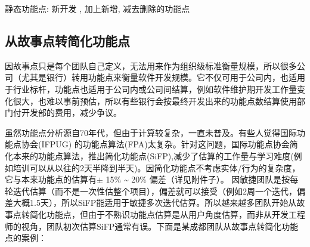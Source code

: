静态功能点: 新开发 , 加上新增, 减去删除的功能点

\begin{description}
\item[]
\end{description}

\hypertarget{ux4eceux6545ux4e8bux70b9ux8f6cux7b80ux5316ux529fux80fdux70b9}{%
\subsection{从故事点转简化功能点}\label{ux4eceux6545ux4e8bux70b9ux8f6cux7b80ux5316ux529fux80fdux70b9}}

因故事点只是每个团队自己定义，无法用来作为组织级标准衡量规模，所以很多公司（尤其是银行）转用功能点来衡量软件开发规模。它不仅可用于公司内，也适用于行业标杆，功能点也适用于公司内或公司间结算，例如软件维护期开发工作量变化很大，也难以事前预估，所以有些银行会按最终开发出来的功能点数结算使用部门付开发部的费用，减少争议。

虽然功能点分析源自70年代，但由于计算较复杂，一直未普及。有些人觉得国际功能点协会(IFPUG) 的功能点算法(FPA)太复杂。针对这问题，国际功能点协会简化本来的功能点算法，推出简化功能点(SiFP),减少了估算的工作量与学习难度(例如培训可以从以往的2天半降到半天)。因简化功能点不考虑实体/行为的复杂度，它与本来功能点的估算有\(\pm\)
15\% \textasciitilde{} 20\% 偏差（详见附件子）。
因敏捷团队是按每轮迭代估算（而不是一次性估整个项目），偏差就可以接受（例如2周一个迭代，偏差大概1.5天），所以SiFP能适用于敏捷多次迭代估算。所以越来越多团队开始从故事点转简化功能点，但由于不熟识功能点估算是从用户角度估算，而非从开发工程师的视角，团队初次估算SiFP通常有误。下面是某成都团队从故事点转简化功能点的案例：

